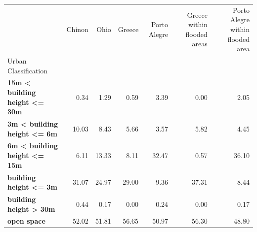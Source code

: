 \begin{tabular}{lrrrrrr}
\toprule
 & Chinon & Ohio & Greece & Porto Alegre & Greece within flooded areas & Porto Alegre within flooded area \\
Urban Classification &  &  &  &  &  &  \\
\midrule
\textbf{15m < building height <= 30m} & 0.34 & 1.29 & 0.59 & 3.39 & 0.00 & 2.05 \\
\textbf{3m < building height <= 6m} & 10.03 & 8.43 & 5.66 & 3.57 & 5.82 & 4.45 \\
\textbf{6m < building height <= 15m} & 6.11 & 13.33 & 8.11 & 32.47 & 0.57 & 36.10 \\
\textbf{building height <= 3m} & 31.07 & 24.97 & 29.00 & 9.36 & 37.31 & 8.44 \\
\textbf{building height > 30m} & 0.44 & 0.17 & 0.00 & 0.24 & 0.00 & 0.17 \\
\textbf{open space} & 52.02 & 51.81 & 56.65 & 50.97 & 56.30 & 48.80 \\
\bottomrule
\end{tabular}
